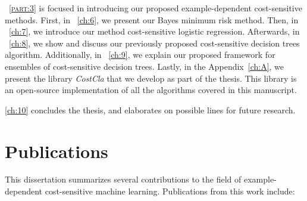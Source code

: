 \partname{~\textsc{\ref{part:3}}} is focused in introducing our proposed example-dependent 
cost-sensitive methods. First, in \chaptername{~\ref{ch:6}}, we present our Bayes minimum risk 
method. Then, in \chaptername{~\ref{ch:7}}, we introduce our method cost-sensitive logistic 
regression. Afterwards, in \chaptername{~\ref{ch:8}}, we show and discuss our previously proposed 
cost-sensitive decision trees algorithm. Additionally, in \chaptername{~\ref{ch:9}}, we explain our 
proposed framework for ensembles of cost-sensitive decision trees. Lastly, in the 
Appendix~\ref{ch:A}, we present the library \mbox{\textit{CostCla}} that we develop as part of 
the thesis. This library is an open-source implementation of all the algorithms covered in this 
manuscript. 

\chaptername{ \ref{ch:10}} concludes the thesis, and elaborates on possible lines for future 
research.

\section{Publications}

This dissertation summarizes several contributions to the field of example-dependent 
cost-sensitive machine learning. Publications from this work include:
\bigskip

